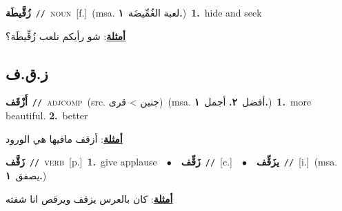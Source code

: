 \documentclass[10pt,a4paper,twoside]{article} %
\begin{document}
\begin{multicols}{2}
{\setlength\topsep{0pt}\textbf{\foreignlanguage{arabic}{زُقَّيطَة}}\ {\color{gray}\texttt{//}\color{black}}\ \textsc{noun}\ [f.]\ \color{gray}(msa. \foreignlanguage{arabic}{لعبة الغُمِّيضَة}~\foreignlanguage{arabic}{\textbf{١.}})\color{black}\ \textbf{1.}~hide and seek\  \begin{flushright}\color{gray}\foreignlanguage{arabic}{\textbf{\underline{\foreignlanguage{arabic}{أمثلة}}}: شو رأيكم نلعب زُقِّيطَة؟}\end{flushright}\color{black}} \vspace{2mm}

\vspace{-3mm}
\subsection*{\color{blue}\foreignlanguage{arabic}{ز.ق.ف}\color{blue}{}} 

{\setlength\topsep{0pt}\textbf{\foreignlanguage{arabic}{أَزْقَف}}\ {\color{gray}\texttt{//}\color{black}}\ \textsc{adj\textunderscore comp}\ (src. \color{gray}\foreignlanguage{arabic}{جنين > قرى}\color{black})\ \color{gray}(msa. \foreignlanguage{arabic}{أفضل}~\foreignlanguage{arabic}{\textbf{٢.}}  \foreignlanguage{arabic}{أجمل}~\foreignlanguage{arabic}{\textbf{١.}})\color{black}\ \textbf{1.}~more beautiful.  \textbf{2.}~better\  \begin{flushright}\color{gray}\foreignlanguage{arabic}{\textbf{\underline{\foreignlanguage{arabic}{أمثلة}}}: أزقف مافيها هي الورود}\end{flushright}\color{black}} \vspace{2mm}

{\setlength\topsep{0pt}\textbf{\foreignlanguage{arabic}{زَقَّف}}\ {\color{gray}\texttt{//}\color{black}}\ \textsc{verb}\ [p.]\ \textbf{1.}~give applause\ \ $\bullet$\ \ \setlength\topsep{0pt}\textbf{\foreignlanguage{arabic}{زَقِّف}}\ {\color{gray}\texttt{//}\color{black}}\ [c.]\ \ $\bullet$\ \ \setlength\topsep{0pt}\textbf{\foreignlanguage{arabic}{يزَقِّف}}\ {\color{gray}\texttt{//}\color{black}}\ [i.]\ \color{gray}(msa. \foreignlanguage{arabic}{يصفق}~\foreignlanguage{arabic}{\textbf{١.}})\color{black}\  \begin{flushright}\color{gray}\foreignlanguage{arabic}{\textbf{\underline{\foreignlanguage{arabic}{أمثلة}}}: كان بالعرس يزقف ويرقص انا شفته}\end{flushright}\color{black}} \vspace{2mm}


\end{multicols}
\end{document}
